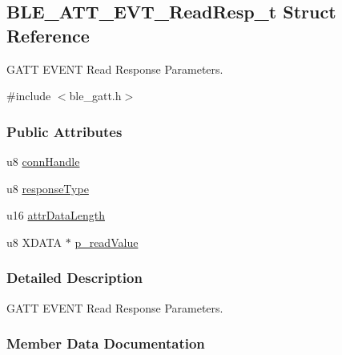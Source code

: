 \hypertarget{struct_b_l_e___a_t_t___e_v_t___read_resp__t}{}\subsection{B\+L\+E\+\_\+\+A\+T\+T\+\_\+\+E\+V\+T\+\_\+\+Read\+Resp\+\_\+t Struct Reference}
\label{struct_b_l_e___a_t_t___e_v_t___read_resp__t}


G\+A\+TT E\+V\+E\+NT Read Response Parameters.  




{\ttfamily \#include $<$ble\+\_\+gatt.\+h$>$}

\subsubsection*{Public Attributes}
\begin{DoxyCompactItemize}
\item 
u8 \hyperlink{struct_b_l_e___a_t_t___e_v_t___read_resp__t_a7326a3bd70e3d6815526a974f2b542c2}{conn\+Handle}
\item 
u8 \hyperlink{struct_b_l_e___a_t_t___e_v_t___read_resp__t_adb39650d43cdd5856fe20a70c857f55d}{response\+Type}
\item 
u16 \hyperlink{struct_b_l_e___a_t_t___e_v_t___read_resp__t_a410fe0a6f901c6376bd6f49d85074094}{attr\+Data\+Length}
\item 
u8 X\+D\+A\+TA $\ast$ \hyperlink{struct_b_l_e___a_t_t___e_v_t___read_resp__t_a6addd12e6a3554ca994ba9f8362d83f5}{p\+\_\+read\+Value}
\end{DoxyCompactItemize}


\subsubsection{Detailed Description}
G\+A\+TT E\+V\+E\+NT Read Response Parameters. 

\subsubsection{Member Data Documentation}

